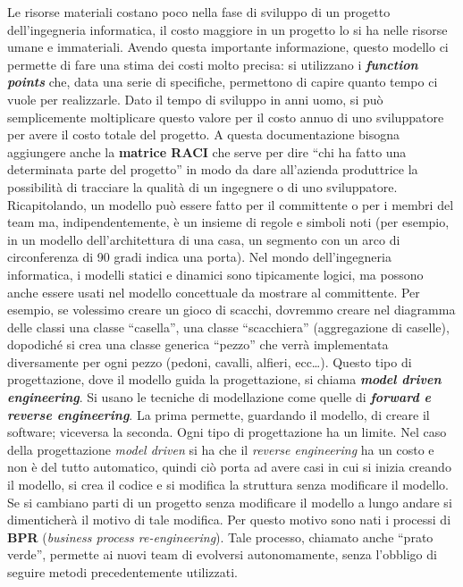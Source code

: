 Le risorse materiali costano poco nella fase di sviluppo di un progetto dell’ingegneria informatica, il costo maggiore in un progetto lo si ha nelle risorse umane e immateriali. Avendo questa importante informazione, questo modello ci permette di fare una stima dei costi molto precisa: si utilizzano i \textbf{\textit{function points}} che, data una serie di specifiche, permettono di capire quanto tempo ci vuole per realizzarle. Dato il tempo di sviluppo in anni uomo, si può semplicemente moltiplicare questo valore per il costo annuo di uno sviluppatore per avere il costo totale del progetto. A questa documentazione bisogna aggiungere anche la \textbf{matrice RACI} che serve per dire “chi ha fatto una determinata parte del progetto” in modo da dare all’azienda produttrice la possibilità di tracciare la qualità di un ingegnere o di uno sviluppatore. Ricapitolando, un modello può essere fatto per il committente o per i membri del team ma, indipendentemente, è un insieme di regole e simboli noti (per esempio, in un modello dell’architettura di una casa, un segmento con un arco di circonferenza di 90 gradi indica una porta). Nel mondo dell’ingegneria informatica, i modelli statici e dinamici sono tipicamente logici, ma possono anche essere usati nel modello concettuale da mostrare al committente. Per esempio, se volessimo creare un gioco di scacchi, dovremmo creare nel diagramma delle classi una classe “casella”, una classe “scacchiera” (aggregazione di caselle), dopodiché si crea una classe generica “pezzo” che verrà implementata diversamente per ogni pezzo (pedoni, cavalli, alfieri, ecc…). Questo tipo di progettazione, dove il modello guida la progettazione, si chiama \textit{\textbf{model driven engineering}}. Si usano le tecniche di modellazione come quelle di \textit{\textbf{forward e reverse engineering}}. La prima permette, guardando il modello, di creare il software; viceversa la seconda. Ogni tipo di progettazione ha un limite. Nel caso della progettazione \textit{model driven} si ha che il \textit{reverse engineering} ha un costo e non è del tutto automatico, quindi ciò porta ad avere casi in cui si inizia creando il modello, si crea il codice e si modifica la struttura senza modificare il modello. Se si cambiano parti di un progetto senza modificare il modello a lungo andare si dimenticherà il motivo di tale modifica. Per questo motivo sono nati i processi di \textbf{BPR} (\textit{business process re-engineering}). Tale processo, chiamato anche “prato verde”, permette ai nuovi team di evolversi autonomamente, senza l’obbligo di seguire metodi precedentemente utilizzati.


